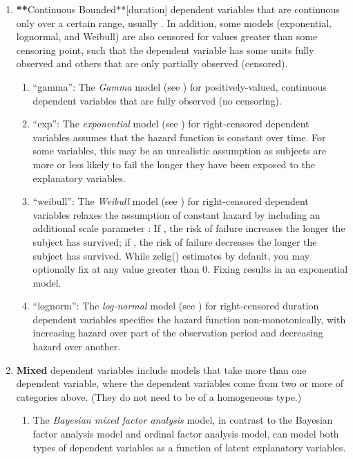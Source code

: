\documentclass[letterpaper,10pt,english]{sphinxmanual}
\begin{document}
\begin{enumerate}
\begin{enumerate}
\end{enumerate}

\item {} 
{\color{red}\bfseries{}**}Continuous Bounded**{[}duration{]} dependent variables that are
continuous only over a certain range, usually . In
addition, some models (exponential, lognormal, and Weibull) are also
censored for values greater than some censoring point, such that the
dependent variable has some units fully observed and others that are
only partially observed (censored).
\begin{enumerate}
\item {} 
“gamma”: The \emph{Gamma} model (see ) for positively-valued,
continuous dependent variables that are fully observed (no
censoring).

\item {} 
“exp”: The \emph{exponential} model (see ) for right-censored dependent
variables assumes that the hazard function is constant over time.
For some variables, this may be an unrealistic assumption as
subjects are more or less likely to fail the longer they have been
exposed to the explanatory variables.

\item {} 
“weibull”: The \emph{Weibull} model (see ) for right-censored dependent
variables relaxes the assumption of constant hazard by including
an additional scale parameter : If
, the risk of failure increases the longer the
subject has survived; if , the risk of failure
decreases the longer the subject has survived. While zelig()
estimates  by default, you may optionally fix
 at any value greater than 0. Fixing
 results in an exponential model.

\item {} 
“lognorm”: The \emph{log-normal} model (see ) for right-censored
duration dependent variables specifies the hazard function
non-monotonically, with increasing hazard over part of the
observation period and decreasing hazard over another.

\end{enumerate}

\item {} 
\textbf{Mixed} dependent variables include models that take more than one
dependent variable, where the dependent variables come from two or
more of categories above. (They do not need to be of a homogeneous
type.)
\begin{enumerate}
\item {} 
The \emph{Bayesian mixed factor analysis} model, in contrast to the
Bayesian factor analysis model and ordinal factor analysis model,
can model both types of dependent variables as a function of
latent explanatory variables.


\end{enumerate}
\end{enumerate}
\end{document}
